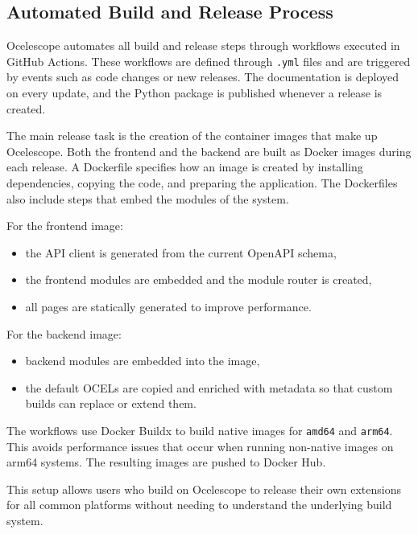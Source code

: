 \subsection{Automated Build and Release Process}

Ocelescope automates all build and release steps through workflows executed in GitHub Actions.
These workflows are defined through \texttt{.yml} files and are triggered by events such as code changes or new releases.
The documentation is deployed on every update, and the Python package is published whenever a release is created.

The main release task is the creation of the container images that make up Ocelescope.
Both the frontend and the backend are built as Docker images during each release.
A Dockerfile specifies how an image is created by installing dependencies, copying the code, and preparing the application.
The Dockerfiles also include steps that embed the modules of the system.

For the frontend image:

\begin{itemize}
	\item the API client is generated from the current OpenAPI schema,
	\item the frontend modules are embedded and the module router is created,
	\item all pages are statically generated to improve performance.
\end{itemize}

For the backend image:

\begin{itemize}
	\item backend modules are embedded into the image,
	\item the default OCELs are copied and enriched with metadata so that custom builds can replace or extend them.
\end{itemize}

The workflows use Docker Buildx to build native images for \texttt{amd64} and \texttt{arm64}.
This avoids performance issues that occur when running non-native images on arm64 systems.
The resulting images are pushed to Docker Hub.

This setup allows users who build on Ocelescope to release their own extensions for all common platforms without needing to understand the underlying build system.
